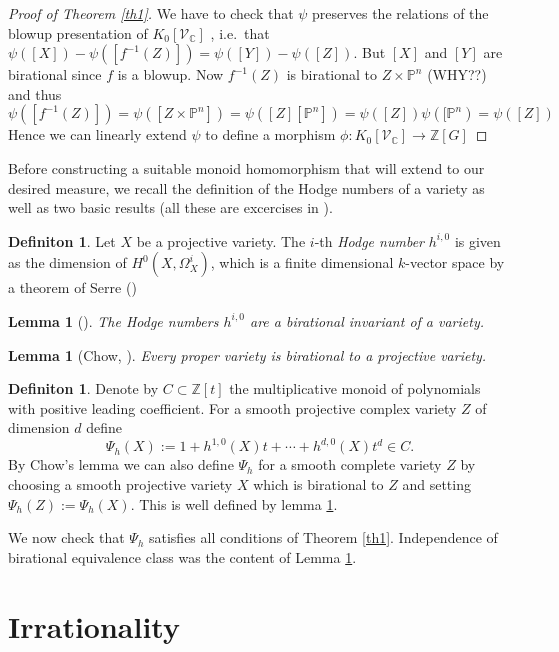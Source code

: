 \documentclass[11pt, a4paper, german]{article}
\theoremstyle{plain}
\newtheorem{lemma}[theorem]{Lemma}
\theoremstyle{definition}
\newtheorem{definition}[theorem]{Definiton}
\newcommand{\gring}[1][k]{K_0[\mathcal{V}_#1]}
\begin{document}
\begin{proof}[Proof of Theorem \ref{th1}]
    We have to check that $\psi$ preserves the relations of the blowup presentation of $\gring[\mathbb{C}]$
    , i.e.\ that $\psi([X]) - \psi([f^{-1}(Z)]) = \psi([Y]) - \psi([Z])$. 
    But $[X]$ and $[Y]$ are birational since $f$ is a blowup.
    Now $f^{-1}(Z)$ is birational to $Z \times \mathbb{P}^n$ (WHY??) and thus 
    \[
        \psi([f^{-1}(Z)]) = \psi([Z \times \mathbb{P}^n]) = \psi([Z][\mathbb{P}^n]) = \psi([Z])\psi([\mathbb{P}^n) = \psi([Z])
    \]
    Hence we can linearly extend $\psi$ to define a morphism $\phi \colon \gring[\mathbb{C}] \to \mathbb{Z} [G]$
\end{proof}

Before constructing a suitable monoid homomorphism that will extend to our desired measure, we recall the definition of the Hodge numbers
of a variety as well as two basic results (all these are excercises in \cite[Ch. II]{Ha}).

\begin{definition}
    Let $X$ be a projective variety. The $i$-th \emph{Hodge number} $h^{i,0}$ is given as the dimension of $H^0(X,\Omega^i_X)$, 
    which is a finite dimensional $k$-vector space by a theorem of Serre (\cite[§3 Prop. 7]{FAC})
\end{definition}

\begin{lemma}[{\cite[II Ex. 8.8]{Ha}}]
    \label{bir}
    The Hodge numbers $h^{i,0}$ are a birational invariant of a variety.
\end{lemma}

\begin{lemma}[Chow, {\cite[II Ex. 4.10]{Ha}}]
    Every proper variety is birational to a projective variety.
\end{lemma}

\begin{definition}
    Denote by $C \subset \mathbb{Z}[t]$ the multiplicative monoid of polynomials with positive leading coefficient.
    For a smooth projective complex variety $Z$ of dimension $d$ define
    \[
        \Psi_h(X) := 1 + h^{1,0}(X)t + \cdots + h^{d,0}(X)t^d \in C.
    \]
    By Chow's lemma we can also define $\Psi_h$ for a smooth complete variety $Z$ by choosing a smooth projective variety $X$ which is birational
    to $Z$ and setting $\Psi_h(Z) := \Psi_h(X)$. This is well defined by lemma \ref{bir}.
\end{definition}

We now check that $\Psi_h$ satisfies all conditions of Theorem \ref{th1}. Independence of birational equivalence class was the content of Lemma
\ref{bir}. 

\section{Irrationality}

{}

\end{document}
